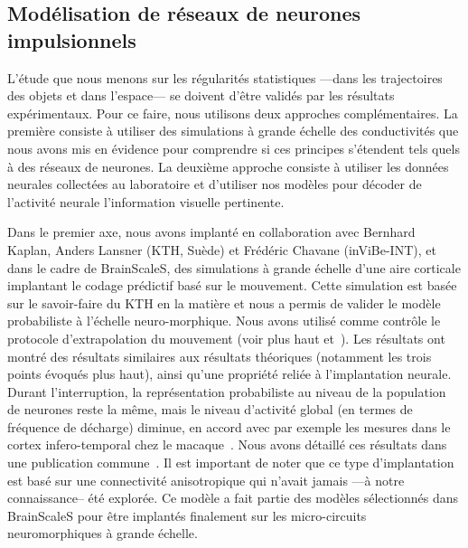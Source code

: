 \documentclass[11pt,french,a4paper,oneside]{article}%
\begin{document}
\subsection{Modélisation de réseaux de neurones impulsionnels~\citep{Taouali15}}%
\label{sec:spikes}
L'étude que nous menons sur les régularités statistiques ---dans les trajectoires des objets et dans l'espace--- se doivent d'être validés par les résultats expérimentaux. Pour ce faire, nous utilisons deux approches complémentaires. La première consiste à utiliser des simulations à grande échelle des conductivités que nous avons mis en évidence pour comprendre si ces principes s'étendent tels quels à des réseaux de neurones. La deuxième approche consiste à utiliser les données neurales collectées au laboratoire et d'utiliser nos modèles pour décoder de l'activité neurale l'information visuelle pertinente.

Dans le premier axe, nous avons implanté en collaboration avec Bernhard Kaplan, Anders Lansner (KTH, Suède) et Frédéric Chavane (inViBe-INT), et dans le cadre de BrainScaleS, des simulations à grande échelle d'une aire corticale implantant le codage prédictif basé sur le mouvement. Cette simulation est basée sur le savoir-faire du KTH en la matière et nous a permis de valider le modèle probabiliste à l'échelle neuro-morphique. Nous avons utilisé comme contrôle le protocole d'extrapolation du mouvement (voir plus haut et~\citep{Khoei13jpp}). Les résultats ont montré des résultats similaires aux résultats théoriques (notamment les trois points évoqués plus haut), ainsi qu'une propriété reliée à l'implantation neurale. Durant l'interruption, la représentation probabiliste au niveau de la population de neurones reste la même, mais le niveau d'activité global (en termes de fréquence de décharge) diminue, en accord avec par exemple les mesures dans le cortex infero-temporal chez le macaque~\citep{Assad95}. Nous avons détaillé ces résultats dans une publication commune~\citep{KaplanKhoei14}. Il est important de noter que ce type d'implantation est basé sur une connectivité anisotropique qui n'avait jamais ---à notre connaissance-- été explorée. Ce modèle a fait partie des modèles sélectionnés dans BrainScaleS pour être implantés finalement sur les micro-circuits neuromorphiques à grande échelle.
\end{document}
